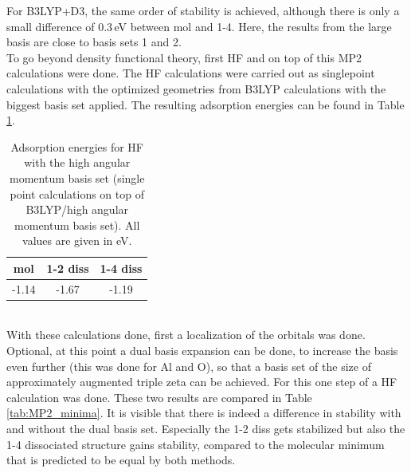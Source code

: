 \documentclass[11pt,DIV=13,BCOR=5mm,a4paper,headinclude]{scrbook}
\begin{document}
For B3LYP+D3, the same order of stability is achieved, although there is only a small difference of $0.3\,$eV between mol and 1-4.
Here, the results from the large basis are close to basis sets 1 and 2.
\\
To go beyond density functional theory, first HF and on top of this MP2 calculations were done.
The HF calculations were carried out as singlepoint calculations with the optimized geometries from B3LYP calculations with the biggest basis set applied.
The resulting adsorption energies can be found in Table \ref{tab:Eads_HF}.
\begin{table}[!h]
  \centering
   \caption{Adsorption energies for HF with the high angular momentum basis set (single point calculations on top of B3LYP/high angular momentum basis set).
All values are given in eV.}
  \begin{tabular}{ccc}
  \toprule
 mol & 1-2 diss & 1-4 diss \\\midrule
 -1.14 & -1.67 & -1.19 \\\bottomrule
  \end{tabular}
  \label{tab:Eads_HF}
\end{table}
 \\
 With these calculations done, first a localization of the orbitals was done.
Optional, at this point a dual basis expansion can be done, to increase the basis even further (this was done for Al and O), so that a basis set of the size of approximately augmented triple zeta can be achieved.
For this one step of a HF calculation was done.
These two results are compared in Table \ref{tab:MP2_minima}.
It is visible that there is indeed a difference in stability with and without the dual basis set.
Especially the 1-2 diss gets stabilized but also the 1-4 dissociated structure gains stability, compared to the molecular minimum that is predicted to be equal by both methods.
\end{document}
